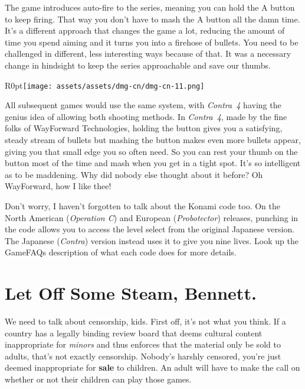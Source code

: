\documentclass{book}
\begin{document}
The game introduces auto-fire to the series, meaning you can hold the A button to keep firing. That way you don’t have to mash the A button all the damn time. It’s a different approach that changes the game a lot, reducing the amount of time you spend aiming and it turns you into a firehose of bullets. You need to be challenged in different, less interesting ways because of that. It was a necessary change in hindsight to keep the series approachable and save our thumbs.\par
\begin{wrapfigure}{R}{0pt}{\texttt{[image: assets/assets/dmg-cn/dmg-cn-11.png]}}\end{wrapfigure}
All subsequent games would use the same system, with \emph{Contra~4} having the genius idea of allowing both shooting methods. In \emph{Contra~4}, made by the fine folks of WayForward Technologies, holding the button gives you a satisfying, steady stream of bullets but mashing the button makes even more bullets appear, giving you that small edge you so often need. So you can rest your thumb on the button most of the time and mash when you get in a tight spot. It’s so intelligent as to be maddening. Why did nobody else thought about it before? Oh WayForward, how I like thee!\par
Don’t worry, I haven’t forgotten to talk about the Konami code too. On the North American (\emph{Operation C}) and European (\emph{Probotector}) releases, punching in the code allows you to access the level select from the original Japanese version. The Japanese (\emph{Contra}) version instead uses it to give you nine lives. Look up the GameFAQs description of what each code does for more details.\par
\FloatBarrier\section*{Let Off Some Steam, Bennett.}
We need to talk about censorship, kids. First off, it’s not what you think. If a country has a legally binding review board that deems cultural content inappropriate for \emph{minors} and thus enforces that the material only be sold to adults, that’s not exactly censorship. Nobody’s harshly censored, you’re just deemed inappropriate for \textbf{sale} to children. An adult will have to make the call on whether or not their children can play those games.\par
\FloatBarrier\vspace{\baselineskip}\centering
\begin{minipage}{0.45\linewidth}\end{minipage}\vspace{2pt}
\end{document}
